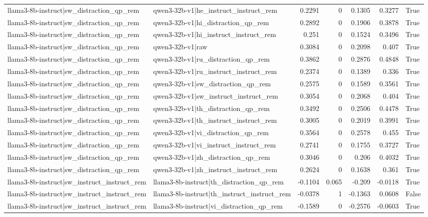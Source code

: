 \begin{table}
\begin{tabular}{l l r r r r l}
llama3-8b-instruct|sw_distraction_qp_rem & qwen3-32b-v1|he_instruct_instruct_rem & 0.2291 & 0 & 0.1305 & 0.3277 & True \\
llama3-8b-instruct|sw_distraction_qp_rem & qwen3-32b-v1|hi_distraction_qp_rem & 0.2892 & 0 & 0.1906 & 0.3878 & True \\
llama3-8b-instruct|sw_distraction_qp_rem & qwen3-32b-v1|hi_instruct_instruct_rem & 0.251 & 0 & 0.1524 & 0.3496 & True \\
llama3-8b-instruct|sw_distraction_qp_rem & qwen3-32b-v1|raw & 0.3084 & 0 & 0.2098 & 0.407 & True \\
llama3-8b-instruct|sw_distraction_qp_rem & qwen3-32b-v1|ru_distraction_qp_rem & 0.3862 & 0 & 0.2876 & 0.4848 & True \\
llama3-8b-instruct|sw_distraction_qp_rem & qwen3-32b-v1|ru_instruct_instruct_rem & 0.2374 & 0 & 0.1389 & 0.336 & True \\
llama3-8b-instruct|sw_distraction_qp_rem & qwen3-32b-v1|sw_distraction_qp_rem & 0.2575 & 0 & 0.1589 & 0.3561 & True \\
llama3-8b-instruct|sw_distraction_qp_rem & qwen3-32b-v1|sw_instruct_instruct_rem & 0.3054 & 0 & 0.2068 & 0.404 & True \\
llama3-8b-instruct|sw_distraction_qp_rem & qwen3-32b-v1|th_distraction_qp_rem & 0.3492 & 0 & 0.2506 & 0.4478 & True \\
llama3-8b-instruct|sw_distraction_qp_rem & qwen3-32b-v1|th_instruct_instruct_rem & 0.3005 & 0 & 0.2019 & 0.3991 & True \\
llama3-8b-instruct|sw_distraction_qp_rem & qwen3-32b-v1|vi_distraction_qp_rem & 0.3564 & 0 & 0.2578 & 0.455 & True \\
llama3-8b-instruct|sw_distraction_qp_rem & qwen3-32b-v1|vi_instruct_instruct_rem & 0.2741 & 0 & 0.1755 & 0.3727 & True \\
llama3-8b-instruct|sw_distraction_qp_rem & qwen3-32b-v1|zh_distraction_qp_rem & 0.3046 & 0 & 0.206 & 0.4032 & True \\
llama3-8b-instruct|sw_distraction_qp_rem & qwen3-32b-v1|zh_instruct_instruct_rem & 0.2624 & 0 & 0.1638 & 0.361 & True \\
llama3-8b-instruct|sw_instruct_instruct_rem & llama3-8b-instruct|th_distraction_qp_rem & -0.1104 & 0.065 & -0.209 & -0.0118 & True \\
llama3-8b-instruct|sw_instruct_instruct_rem & llama3-8b-instruct|th_instruct_instruct_rem & -0.0378 & 1 & -0.1363 & 0.0608 & False \\
llama3-8b-instruct|sw_instruct_instruct_rem & llama3-8b-instruct|vi_distraction_qp_rem & -0.1589 & 0 & -0.2576 & -0.0603 & True \\

\end{tabular}
\end{table}
